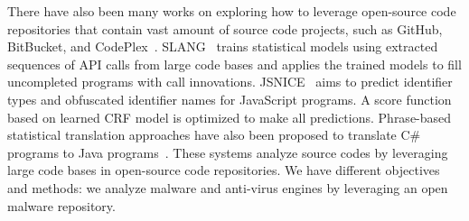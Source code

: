There have also been many works on exploring how to leverage open-source code repositories that contain vast amount of source code projects, 
such as GitHub, BitBucket, and CodePlex~\cite{code-completion,big-predicting,big-translation}. 
SLANG~\cite{code-completion} trains statistical models using extracted sequences of API calls from large code bases
and applies the trained models to fill uncompleted programs with call innovations. 
JSNICE~\cite{big-predicting} aims to predict identifier types and obfuscated identifier names for JavaScript programs. 
A score function based on learned CRF model is optimized to make all predictions. 
Phrase-based statistical translation approaches have also been proposed
to translate C\# programs to Java programs~\cite{big-translation}. 
These systems analyze source codes by leveraging large code bases in open-source code repositories.
We have different objectives and methods: 
we analyze malware and anti-virus engines by leveraging an open malware repository.


